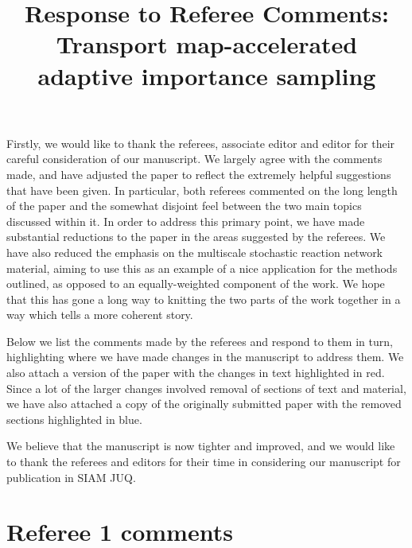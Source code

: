 \documentclass{article}
\begin{document}
\title{Response to Referee Comments: Transport map-accelerated adaptive importance sampling}
\maketitle

Firstly, we would like to thank the referees, associate editor and editor for their careful consideration of our manuscript. We largely agree with the comments made, and have adjusted the paper to reflect the extremely helpful suggestions that have been given. In particular, both referees commented on the long length of the paper and the somewhat disjoint feel between the two main topics discussed within it. In order to address this primary point, we have made substantial reductions to the paper in the areas suggested by the referees. We have also reduced the emphasis on the multiscale stochastic reaction network material, aiming to use this as an example of a nice application for the methods outlined, as opposed to an equally-weighted component of the work. We hope that this has gone a long way to knitting the two parts of the work together in a way which tells a more coherent story.

Below we list the comments made by the referees and respond to them in turn, highlighting where we have made changes in the manuscript to address them. We also attach a version of the paper with the changes in text highlighted in red. Since a lot of the larger changes involved removal of sections of text and material, we have also attached a copy of the originally submitted paper with the removed sections highlighted in blue.

We believe that the manuscript is now tighter and improved, and we would like to thank the referees and editors for their time in considering our manuscript for publication in SIAM JUQ.


\section*{Referee 1 comments}
\end{document}

